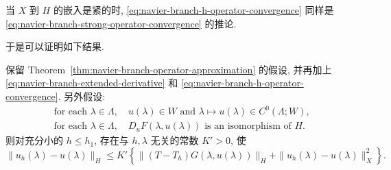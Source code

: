 \setcounter{statement}{6}
\begin{Remark}\label{rem:navier-branch-compact-embedding-h}
当 $X$ 到 $H$ 的嵌入是紧的时,
\eqref{eq:navier-branch-h-operator-convergence} 同样是
\eqref{eq:navier-branch-strong-operator-convergence} 的推论.
\end{Remark}

于是可以证明如下结果.

\setcounter{statement}{4}
\begin{Theorem}\label{thm:navier-branch-sharper-norm-error}
保留 Theorem~\ref{thm:navier-branch-operator-approximation} 的假设, 并再加上
\eqref{eq:navier-branch-extended-derivative} 和
\eqref{eq:navier-branch-h-operator-convergence}. 另外假设:
\begin{align}
&\text{for each }\lambda\in\Lambda,\quad
u(\lambda)\in W\text{ and }\lambda\mapsto u(\lambda)
\in C^0(\Lambda;W),
\label{eq:navier-branch-solution-in-w}\\
&\text{for each }\lambda\in\Lambda,\quad
D_uF(\lambda,u(\lambda))\text{ is an isomorphism of }H.
\label{eq:navier-branch-derivative-isomorphism-h}
\end{align}
则对充分小的 $h\leq h_1$, 存在与 $h,\lambda$ 无关的常数 $K'>0$, 使
\begin{equation}\label{eq:navier-branch-sharper-error}
\|u_h(\lambda)-u(\lambda)\|_H
\leq K'\left\{
\|(T-T_h)G(\lambda,u(\lambda))\|_H
+\|u_h(\lambda)-u(\lambda)\|_X^2
\right\}.
\end{equation}
\end{Theorem}

